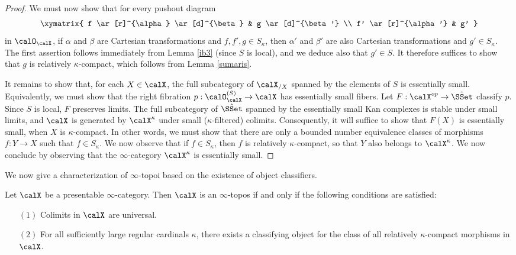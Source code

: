 \begin{proof}
We must now show that for every pushout diagram
$$ \xymatrix{ f \ar[r]^{\alpha} \ar[d]^{\beta} & g \ar[d]^{\beta'} \\
f' \ar[r]^{\alpha'} & g' }$$
in $\calO_{\calX}$, if $\alpha$ and $\beta$ are Cartesian transformations and
$f,f',g \in S_{\kappa}$, then $\alpha'$ and $\beta'$ are also Cartesian transformations and $g' \in S_{\kappa}$. The first assertion follows immediately from Lemma \ref{ib3} (since $S$ is local), and we deduce also that $g' \in S$. It therefore suffices to show that $g$ is relatively $\kappa$-compact, which follows from Lemma \ref{sumaris}.

It remains to show that, for each $X \in \calX$, the full subcategory of $\calX_{/X}$ spanned by
the elements of $S$ is essentially small. Equivalently, we must show that the right fibration
$p: \calO_{\calX}^{(S)} \rightarrow \calX$ has essentially small fibers. Let
$F: \calX^{op} \rightarrow \hat{\SSet}$ classify $p$. Since $S$ is local, $F$ preserves limits.
The full subcategory of $\hat{\SSet}$ spanned by the essentially small Kan complexes is stable under small limits, and $\calX$ is generated by $\calX^{\kappa}$ under small ($\kappa$-filtered) colimits. Consequently, it will suffice to show that $F(X)$ is essentially small, when $X$ is $\kappa$-compact. In other words, we must show that there are only a bounded number equivalence classes of morphisms $f: Y \rightarrow X$ such that $f \in S_{\kappa}$. We now observe that if
$f \in S_{\kappa}$, then $f$ is relatively $\kappa$-compact, so that $Y$ also belongs to $\calX^{\kappa}$. We now conclude by observing that the $\infty$-category $\calX^{\kappa}$ is essentially small.
\end{proof}

We now give a characterization of $\infty$-topoi based on the existence of object classifiers.

\begin{theorem}[Rezk]\label{colimsurt}
Let $\calX$ be a presentable $\infty$-category. Then
$\calX$ is an $\infty$-topos if and only if the following conditions are satisfied:
\begin{itemize}
\item[$(1)$] Colimits in $\calX$ are universal.
\item[$(2)$] For all sufficiently large regular cardinals $\kappa$, there exists
a classifying object for the class of all relatively $\kappa$-compact morphisms
in $\calX$.
\end{itemize}
\end{theorem}

